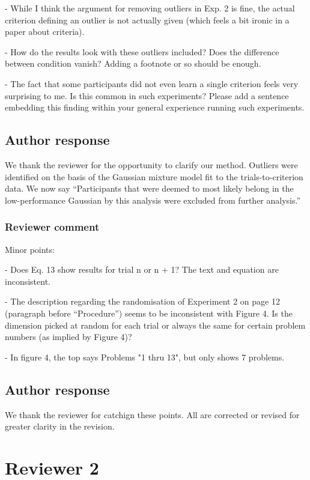 \documentclass[12pt]{article}
\begin{document}
- While I think the argument for removing outliers in Exp. 2
is fine, the actual criterion defining an outlier is not
actually given (which feels a bit ironic in a paper about
criteria).

- How do the results look with these outliers included? Does
the difference between condition vanish? Adding a footnote
or so should be enough.

- The fact that some participants did not even learn a
single criterion feels very surprising to me. Is this common
in such experiments? Please add a sentence embedding this
finding within your general experience running such
experiments.

\subsection{Author response}
We thank the reviewer for the opportunity to clarify our
method. Outliers were identified on the basis of the Gaussian
mixture model fit to the trials-to-criterion data. We now
say ``Participants that were deemed to most likely belong in
the low-performance Gaussian by this analysis were excluded
from further analysis.''

\subsubsection{Reviewer comment}
Minor points:

- Does Eq. 13 show results for trial n or n + 1? The text
and equation are inconsistent.

- The description regarding the randomisation of Experiment
2 on page 12 (paragraph before ``Procedure'') seems to be
inconsistent with Figure 4. Is the dimension picked at
random for each trial or always the same for certain problem
numbers (as implied by Figure 4)?

- In figure 4, the top says Problems "1 thru 13", but only
shows 7 problems.

\subsection{Author response}
We thank the reviewer for catchign these points. All are
corrected or revised for greater clarity in the revision.

\section{Reviewer 2}
\end{document}

